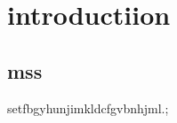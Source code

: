 \documentclass{report}
\begin{document}
\section{introductiion}
\label{sec:s}

\subsection{mss}
setfbgyhunjimkldcfgvbnhjml.;
\end{document}
